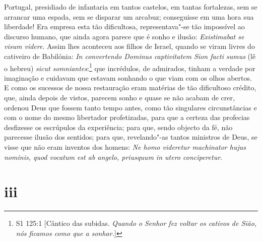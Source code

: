 Portugal, presidiado de infantaria em tantos castelos, em tantas
fortalezas, sem se arrancar uma espada, sem se disparar um arcabuz;
conseguisse em uma hora sua liberdade! Era empresa esta tão dificultosa,
representava"-se tão impossível ao discurso humano, que ainda agora
parece que é sonho e ilusão: \emph{Existimabat se visum videre}. Assim
lhes aconteceu aos filhos de Israel, quando se viram livres do cativeiro
de Babilónia: \emph{In convertendo Dominus captivitatem Sion facti
sumus} (lê o hebreu) \emph{sicut somniantes}:\footnote{S1 125:1 [Cântico das subidas. \textit{Quando o Senhor fez voltar os cativos de Sião, nós ficamos como que a sonhar.}]} que incrédulos, de
admirados, tinham a verdade por imaginação e cuidavam que estavam
sonhando o que viam com os olhos abertos. E como os sucessos de nossa
restauração eram matérias de tão dificultoso crédito, que, ainda depois
de vistos, parecem sonho e quase se não acabam de crer, ordenou Deus que
fossem tanto tempo antes, como tão singulares circunstâncias e com o
nome do mesmo libertador profetizadas, para que a certeza das profecias
desfizesse os escrúpulos da experiência; para que, sendo objecto da fé,
não parecesse ilusão dos sentidos; para que, revelando"-as tantos
ministros de Deus, se visse que não eram inventos dos homens: \emph{Ne
homo videretur machinator hujus nominis, quod vocatum est ab angelo,
priusquum in utero conciperetur}.

\section*{iii}

